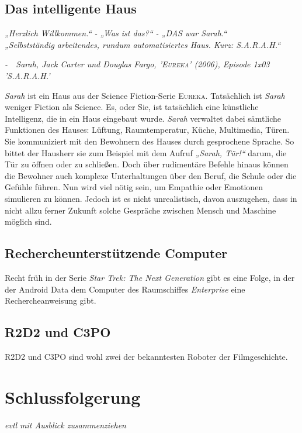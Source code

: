 \documentclass[12pt,twoside]{article}
\theoremstyle{plain}
\theoremstyle{definition}
\theoremstyle{remark}
\begin{document}
\subsection{Das intelligente Haus}
\label{ssec:sarah}
\textit{„Herzlich Willkommen.“ - „Was ist das?“ - „DAS war Sarah.“\\
        „Selbstständig arbeitendes, rundum automatisiertes Haus. Kurz: S.A.R.A.H.“}
\begin{flushright}
    \textit{-~~Sarah, Jack Carter und Douglas Fargo, \textsc{'Eureka'} (2006), Episode 1x03 'S.A.R.A.H.'}
\end{flushright}
\textit{Sarah} ist ein Haus aus der Science Fiction-Serie \textsc{Eureka}.
Tatsächlich ist \textit{Sarah} weniger Fiction als Science.
Es, oder Sie, ist tatsächlich eine künstliche Intelligenz, die in ein Haus eingebaut wurde.
\textit{Sarah} verwaltet dabei sämtliche Funktionen des Hauses: Lüftung, Raumtemperatur, Küche, Multimedia, Türen.
Sie kommuniziert mit den Bewohnern des Hauses durch gesprochene Sprache.
So bittet der Hausherr sie zum Beispiel mit dem Aufruf \textit{„Sarah, Tür!“} darum, die Tür zu öffnen oder zu schließen.
Doch über rudimentäre Befehle hinaus können die Bewohner auch komplexe Unterhaltungen über den Beruf, die Schule oder die Gefühle führen.
Nun wird viel nötig sein, um Empathie oder Emotionen simulieren zu können.
Jedoch ist es nicht unrealistisch, davon auszugehen, dass in nicht allzu ferner Zukunft solche Gespräche zwischen Mensch und Maschine möglich sind.
\subsection{Rechercheunterstützende Computer}
\label{ssec:data}
Recht früh in der Serie \textit{Star Trek: The Next Generation} gibt es eine Folge, in der der Android Data dem Computer des Raumschiffes \textit{Enterprise} eine Rechercheanweisung gibt.
\subsection{R2D2 und C3PO}
\label{ssec:r2d2}
R2D2 und C3PO sind wohl zwei der bekanntesten Roboter der Filmgeschichte.

\section{Schlussfolgerung}
\label{sec:concl}
\textit{evtl mit Ausblick zusammenziehen}



%
%
\newpage


\nocite{*}
\end{document}
